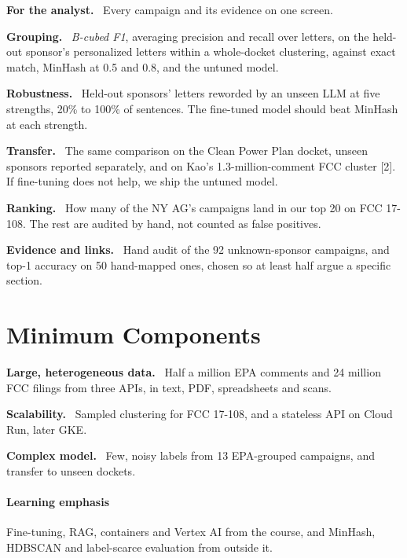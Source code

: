 \documentclass[10pt,twocolumn]{article}
\newcommand{\lead}[1]{\textbf{#1.}\ }
\begin{document}
\begin{leads}
  \item \lead{For the analyst} Every campaign and its evidence on one screen.
  \item \lead{Grouping} \emph{B-cubed F1}, averaging precision and recall over letters, on the
        held-out sponsor's personalized letters within a whole-docket clustering, against exact match,
        MinHash at 0.5 and 0.8, and the untuned model.
  \item \lead{Robustness} Held-out sponsors' letters reworded by an unseen LLM at five strengths, 20\% to 100\% of sentences. The fine-tuned model should beat MinHash at each strength.
  \item \lead{Transfer} The same comparison on the Clean Power Plan docket, unseen sponsors
        reported separately, and on Kao's 1.3-million-comment FCC cluster [2]. If fine-tuning does not
        help, we ship the untuned model.
  \item \lead{Ranking} How many of the NY AG's campaigns land in our top 20 on FCC 17-108. The rest are
        audited by hand, not counted as false positives.
  \item \lead{Evidence and links} Hand audit of the 92 unknown-sponsor campaigns, and top-1 accuracy on
        50 hand-mapped ones, chosen so at least half argue a specific section.
\end{leads}

\section{Minimum Components}

\begin{leads}
  \item \lead{Large, heterogeneous data} Half a million EPA comments and 24 million FCC filings
        from three APIs, in text, PDF, spreadsheets and scans.
  \item \lead{Scalability} Sampled clustering for FCC 17-108, and a stateless API on Cloud Run,
        later GKE.
  \item \lead{Complex model} Few, noisy labels from 13 EPA-grouped campaigns, and transfer
        to unseen dockets.
\end{leads}

\paragraph{Learning emphasis} Fine-tuning, RAG, containers and Vertex AI from the course, and MinHash,
HDBSCAN and label-scarce evaluation from outside it.
\end{document}
